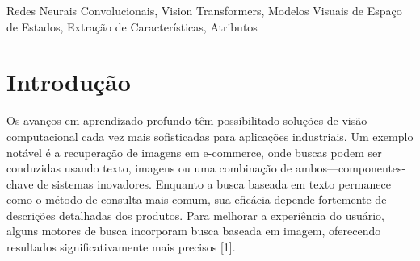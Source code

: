 \documentclass[conference]{IEEEtran}
\begin{document}
\begin{abstract}
Este estudo investiga as capacidades de extração hierárquica de características de arquiteturas modernas de redes neurais pré-treinadas para reconhecimento de atributos visuais, especificamente direcionado a atributos de cor e textura em imagens de roupas. Avaliamos quatro arquiteturas backbone distintas representando diferentes paradigmas: VGG-16 e ResNet-50 como redes neurais convolucionais clássicas, iBOT como um Vision Transformer auto-supervisionado, e VMamba como um Modelo Visual de Espaço de Estados. Características são extraídas de camadas intermediárias de cada arquitetura e avaliadas usando classificação k-Nearest Neighbors com validação cruzada de 5 folds. Nossos experimentos revelam que diferentes profundidades arquiteturais exibem sensibilidades variadas a atributos de cor e textura, com camadas iniciais consistentemente capturando informação de cor enquanto camadas mais profundas melhor representam padrões de textura. Os resultados demonstram que o iBOT alcança o melhor reconhecimento de textura (97,2\% no bloco 9) enquanto ResNet-50 e iBOT empatam para reconhecimento de cor (95,9\%). Estes achados fornecem insights sobre a especialização de características por camada através de diferentes paradigmas de redes neurais e orientação prática para sistemas de recuperação de imagens baseados em atributos.

\end{abstract}

\begin{IEEEkeywords}
Redes Neurais Convolucionais, Vision Transformers, Modelos Visuais de Espaço de Estados, Extração de Características, Atributos
\end{IEEEkeywords}

\section{Introdução}
Os avanços em aprendizado profundo têm possibilitado soluções de visão computacional cada vez mais sofisticadas para aplicações industriais. Um exemplo notável é a recuperação de imagens em e-commerce, onde buscas podem ser conduzidas usando texto, imagens ou uma combinação de ambos—componentes-chave de sistemas inovadores. Enquanto a busca baseada em texto permanece como o método de consulta mais comum, sua eficácia depende fortemente de descrições detalhadas dos produtos. Para melhorar a experiência do usuário, alguns motores de busca incorporam busca baseada em imagem, oferecendo resultados significativamente mais precisos [1].
\end{document}

